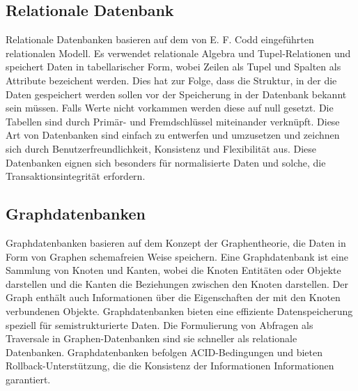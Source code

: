 
\subsection{Relationale Datenbank} %
\label{sec:relationaleDatenbanken}
Relationale Datenbanken basieren auf dem von E. F. Codd eingeführten relationalen Modell. Es verwendet relationale Algebra und Tupel-Relationen und speichert Daten in tabellarischer Form, wobei Zeilen als Tupel und Spalten als Attribute bezeichent werden. Dies hat zur Folge, dass die Struktur, in der die Daten gespeichert werden sollen vor der Speicherung in der Datenbank bekannt sein müssen. Falls Werte nicht vorkammen werden diese auf null gesetzt. Die Tabellen sind durch Primär- und Fremdschlüssel miteinander verknüpft. Diese Art von Datenbanken sind einfach zu entwerfen und umzusetzen und zeichnen sich durch Benutzerfreundlichkeit, Konsistenz und Flexibilität aus. Diese Datenbanken eignen sich besonders für normalisierte Daten und solche, die Transaktionsintegrität erfordern.
 \citep{relationalDatabase}  \citep{9677042}
\subsection{Graphdatenbanken} %
\label{sec:graphDatenbanken}
Graphdatenbanken basieren auf dem Konzept der Graphentheorie, die Daten in Form von Graphen schemafreien Weise speichern. Eine Graphdatenbank ist eine Sammlung von Knoten und Kanten, wobei die Knoten Entitäten oder Objekte darstellen und die Kanten die Beziehungen zwischen den Knoten darstellen. Der Graph  enthält auch Informationen über die Eigenschaften der mit den Knoten verbundenen Objekte. Graphdatenbanken bieten eine effiziente Datenspeicherung speziell für semistrukturierte Daten. Die Formulierung von Abfragen als Traversale in Graphen-Datenbanken sind sie schneller als relationale Datenbanken. Graphdatenbanken befolgen ACID-Bedingungen und bieten Rollback-Unterstützung, die die Konsistenz der Informationen Informationen garantiert.
\citep{9677042}

